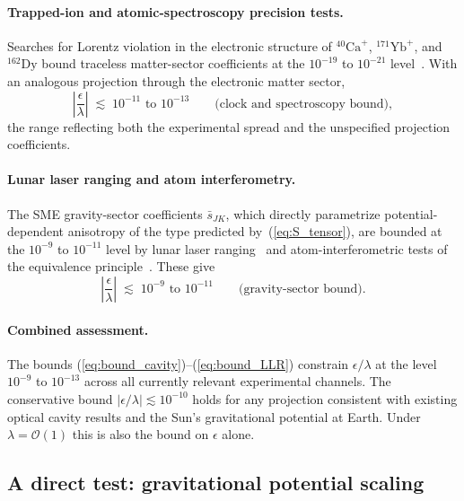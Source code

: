 \documentclass[a4paper,fleqn]{cas-dc}
\theoremstyle{thmstyleone}%
\theoremstyle{thmstyletwo}%
\begin{document}
\paragraph{Trapped-ion and atomic-spectroscopy precision tests.}
Searches for Lorentz violation in the electronic structure of
$^{40}\mathrm{Ca}^{+}$, $^{171}\mathrm{Yb}^{+}$, and
$^{162}\mathrm{Dy}$ bound traceless matter-sector coefficients
at the $10^{-19}$ to $10^{-21}$
level~\cite{Pruttivarasin2015,Sanner2019,Hohensee2013,
Lange2021}. With an analogous projection through the
electronic matter sector,
\begin{equation}
    \left|\frac{\epsilon}{\lambda}\right|
    \;\lesssim\;10^{-11}\text{ to }10^{-13}
    \qquad\text{(clock and spectroscopy bound)},
    \label{eq:bound_clock}
\end{equation}
the range reflecting both the experimental spread and the
unspecified projection coefficients.

\paragraph{Lunar laser ranging and atom interferometry.}
The SME gravity-sector coefficients $\bar{s}_{JK}$, which
directly parametrize potential-dependent anisotropy of the
type predicted by~(\ref{eq:S_tensor}), are bounded at the
$10^{-9}$ to $10^{-11}$ level by lunar laser
ranging~\cite{Battat2007} and atom-interferometric tests of
the equivalence principle~\cite{MullerChu2010}. These give
\begin{equation}
    \left|\frac{\epsilon}{\lambda}\right|
    \;\lesssim\;10^{-9}\text{ to }10^{-11}
    \qquad\text{(gravity-sector bound)}.
    \label{eq:bound_LLR}
\end{equation}

\paragraph{Combined assessment.}
The bounds (\ref{eq:bound_cavity})--(\ref{eq:bound_LLR})
constrain $\epsilon/\lambda$ at the level $10^{-9}$ to
$10^{-13}$ across all currently relevant experimental
channels. The conservative bound
$|\epsilon/\lambda|\lesssim 10^{-10}$ holds for any projection
consistent with existing optical cavity results and the Sun's
gravitational potential at Earth. Under
$\lambda=\mathcal{O}(1)$ this is also the bound on $\epsilon$
alone.

\subsection{A direct test: gravitational potential scaling}
\label{sec:scaling_test}
\end{document}
